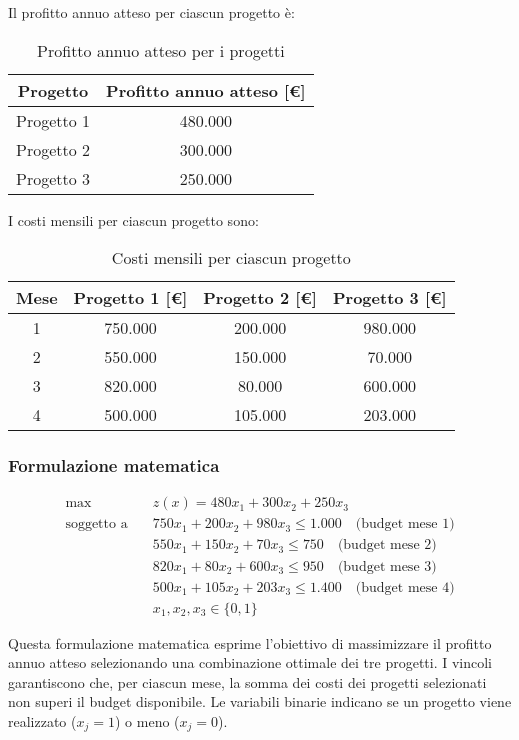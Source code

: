 Il profitto annuo atteso per ciascun progetto è:
\begin{table}[htbp]
    \centering
    \caption{Profitto annuo atteso per i progetti}
    \begin{tabular}{|c|c|}
        \hline
        \textbf{Progetto} & \textbf{Profitto annuo atteso [€]} \\
        \hline
        Progetto 1 & 480.000 \\
        Progetto 2 & 300.000 \\
        Progetto 3 & 250.000 \\
        \hline
    \end{tabular}
\end{table}

I costi mensili per ciascun progetto sono:
\begin{table}[htbp]
    \centering
    \caption{Costi mensili per ciascun progetto}
    \begin{tabular}{|c|c|c|c|}
        \hline
        \textbf{Mese} & \textbf{Progetto 1 [€]} & \textbf{Progetto 2 [€]} & \textbf{Progetto 3 [€]} \\
        \hline
        1 & 750.000 & 200.000 & 980.000 \\
        2 & 550.000 & 150.000 & 70.000 \\
        3 & 820.000 & 80.000 & 600.000 \\
        4 & 500.000 & 105.000 & 203.000 \\
        \hline
    \end{tabular}
\end{table}

\subsubsection{Formulazione matematica}
\[
\begin{aligned}
\max \quad & z(x)= 480x_1 + 300x_2 + 250x_3 \\
\text{soggetto a} \quad & 750x_1 + 200x_2 + 980x_3 \leq 1.000 \quad \text{(budget mese 1)} \\
& 550x_1 + 150x_2 + 70x_3 \leq 750 \quad \text{(budget mese 2)} \\
& 820x_1 + 80x_2 + 600x_3 \leq 950 \quad \text{(budget mese 3)} \\
& 500x_1 + 105x_2 + 203x_3 \leq 1.400 \quad \text{(budget mese 4)} \\
& x_1, x_2, x_3 \in \{0,1\}
\end{aligned}
\]

Questa formulazione matematica esprime l'obiettivo di massimizzare il profitto annuo atteso 
selezionando una combinazione ottimale dei tre progetti. I vincoli garantiscono che, per ciascun mese, 
la somma dei costi dei progetti selezionati non superi il budget disponibile. Le variabili binarie 
indicano se un progetto viene realizzato ($x_j = 1$) o meno ($x_j = 0$).

